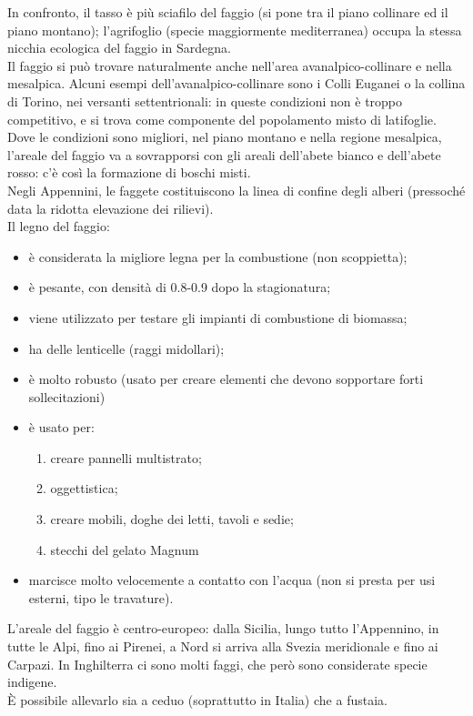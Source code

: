 In confronto, il tasso è più sciafilo del faggio (si pone tra il piano collinare ed il piano montano); l'agrifoglio (specie maggiormente mediterranea) occupa la stessa nicchia ecologica del faggio in Sardegna.\\
Il faggio si può trovare naturalmente anche nell'area avanalpico-collinare e nella mesalpica. Alcuni esempi dell'avanalpico-collinare sono i Colli Euganei o la collina di Torino, nei versanti settentrionali: in queste condizioni non è troppo competitivo, e si trova come componente del popolamento misto di latifoglie.\\
Dove le condizioni sono migliori, nel piano montano e nella regione mesalpica, l'areale del faggio va a sovrapporsi con gli areali dell'abete bianco e dell'abete rosso: c'è così la formazione di boschi misti.\\
Negli Appennini, le faggete costituiscono la linea di confine degli alberi (pressoché data la ridotta elevazione dei rilievi).\\
Il legno del faggio:
\begin{itemize}[nosep]
    \item è considerata la migliore legna per la combustione (non scoppietta);
    \item è pesante, con densità di 0.8-0.9 dopo la stagionatura;
    \item viene utilizzato per testare gli impianti di combustione di biomassa;
    \item ha delle lenticelle (raggi midollari);
    \item è molto robusto (usato per creare elementi che devono sopportare forti sollecitazioni)
    \item è usato per:
    \begin{enumerate}[nosep]
        \item creare pannelli multistrato;
        \item oggettistica;
        \item creare mobili, doghe dei letti, tavoli e sedie;
        \item stecchi del gelato Magnum
    \end{enumerate}
    \item marcisce molto velocemente a contatto con l'acqua (non si presta per usi esterni, tipo le travature).
\end{itemize}
L'areale del faggio è centro-europeo: dalla Sicilia, lungo tutto l'Appennino, in tutte le Alpi, fino ai Pirenei, a Nord si arriva alla Svezia meridionale e fino ai Carpazi. In Inghilterra ci sono molti faggi, che però sono considerate specie indigene.\\
È possibile allevarlo sia a ceduo (soprattutto in Italia) che a fustaia.
